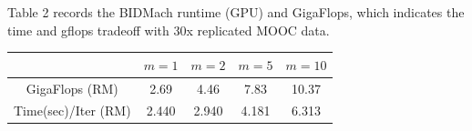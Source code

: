 \documentclass[a0paper,portrait]{baposter}
\begin{document}
\begin{poster}
{Table 2 records the BIDMach runtime (GPU) and GigaFlops, which indicates the time and gflops tradeoff with 30x replicated MOOC data.

\begin{center}
\begin{tabular}{ |c|c|c|c|c| } 
\hline
               & $m=1$ & $m=2$ & $m=5$ & $m=10$   \\
\hline \hline

GigaFlops (RM) & 2.69  & 4.46  & 7.83   & 10.37    \\ 
Time(sec)/Iter (RM) & 2.440 & 2.940 & 4.181  & 6.313     \\
\hline
\end{tabular}
\end{center}

}


\end{poster}
\end{document}

